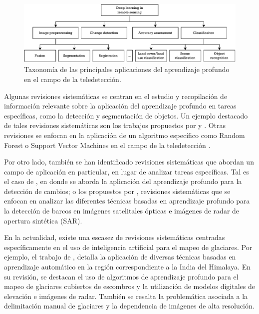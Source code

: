 \begin{figure}[H]
    \begin{center}
    \includegraphics[width=1\textwidth]{Images/DeepLearningRemoteSensing.pdf}
    \end{center}
    \caption{Taxonomía de las principales aplicaciones del aprendizaje profundo en el campo de la teledetección.}
     \label{fig:DeepLearningRemoteSensing}
\end{figure}

Algunas revisiones sistemáticas se centran en el estudio y recopilación de información relevante sobre la aplicación del aprendizaje profundo en tareas específicas, como la detección y segmentación de objetos. Un ejemplo destacado de tales revisiones sistemáticas son los trabajos propuestos por  y . Otras revisiones se enfocan en la aplicación de un algoritmo específico como Random Forest o Support Vector Machines en el campo de la teledetección \cite{mountrakis2011support, belgiu2016random}.

Por otro lado, también se han identificado revisiones sistemáticas que abordan un campo de aplicación en particular, en lugar de analizar tareas específicas. Tal es el caso de , en donde se aborda la aplicación del aprendizaje profundo para la detección de cambios; o los propuestos por , revisiones sistemáticas que se enfocan en analizar las diferentes técnicas basadas en aprendizaje profundo para la detección de barcos en imágenes satelitales ópticas e imágenes de radar de apertura sintética (SAR).

En la actualidad, existe una escasez de revisiones sistemáticas centradas específicamente en el uso de inteligencia artificial para el mapeo de glaciares. Por ejemplo, el trabajo de , detalla la aplicación de diversas técnicas basadas en aprendizaje automático en la región correspondiente a la India del Himalaya. En su revisión, se destacan el uso de algoritmos de aprendizaje profundo para el mapeo de glaciares cubiertos de escombros y la utilización de modelos digitales de elevación e imágenes de radar. También se resalta la problemática asociada a la delimitación manual de glaciares y la dependencia de imágenes de alta resolución.

